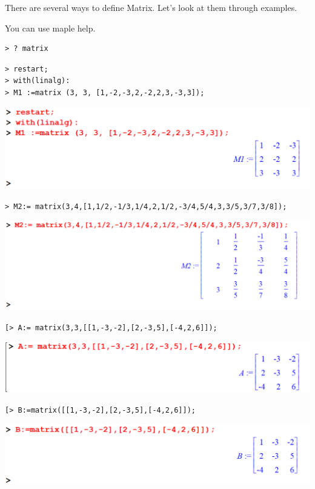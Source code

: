 \documentclass[
]{book}
\theoremstyle{definition}
\theoremstyle{definition}
\theoremstyle{definition}
\theoremstyle{definition}
\theoremstyle{remark}
\begin{document}
There are several ways to define Matrix. Let's look at them through examples.

You can use maple help.

\begin{verbatim}
> ? matrix
\end{verbatim}

\begin{verbatim}
> restart;
> with(linalg):
> M1 :=matrix (3, 3, [1,-2,-3,2,-2,2,3,-3,3]);
\end{verbatim}

\includegraphics{figures/Lesson 4/fig1.png}

\begin{verbatim}
> M2:= matrix(3,4,[1,1/2,-1/3,1/4,2,1/2,-3/4,5/4,3,3/5,3/7,3/8]);
\end{verbatim}

\includegraphics{figures/Lesson 4/fig2.png}

\begin{verbatim}
[> A:= matrix(3,3,[[1,-3,-2],[2,-3,5],[-4,2,6]]);
\end{verbatim}

\includegraphics{figures/Lesson 4/fig3.png}

\begin{verbatim}
[> B:=matrix([[1,-3,-2],[2,-3,5],[-4,2,6]]);
\end{verbatim}

\includegraphics{figures/Lesson 4/fig4.png}
\end{document}
